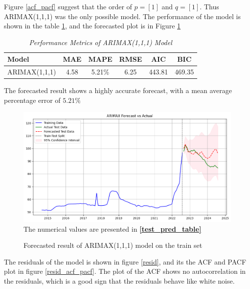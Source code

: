 \documentclass[11pt]{article}
\begin{document}
Figure \ref{acf_pacf} suggest that the order of $p = [1]$ and $q = [1]$. Thus ARIMAX(1,1,1) was the only possible model. The performance of the model is shown in the table \ref{arimax111}, and the forecasted plot is in Figure  \ref{traintest} 

\begin{table}[H]
    \caption{\textit{Performance Metrics of ARIMAX(1,1,1) Model}}
    \label{arimax111}
    \centering
    \begin{tabular}{lccccc}
        \toprule
        Model & MAE & MAPE & RMSE & AIC & BIC \\
        \midrule
        ARIMAX(1,1,1) & 4.58 & 5.21\% & 6.25 & 443.81 & 469.35 \\
        \bottomrule
    \end{tabular}
\end{table}

The forecasted result shows a highly accurate forecast, with a mean average percentage error of $5.21\%$ 

\begin{figure}[h]
    \caption{Forecasted result of ARIMAX(1,1,1) model on the train set}
    \label{traintest}
    \centering
    \includegraphics[width = \textwidth]{train_test_forecast.png}
    The numerical values are presented in \textbf{\ref{test_pred_table}}
\end{figure}


\newpage

The residuals of the model is shown in figure \ref{resid}, and its the ACF and PACF plot in figure \ref{resid_acf_pacf}. The plot of the ACF shows no autocorrelation in the residuals, which is a good sign that the residuals behave like white noise. 
\end{document}
